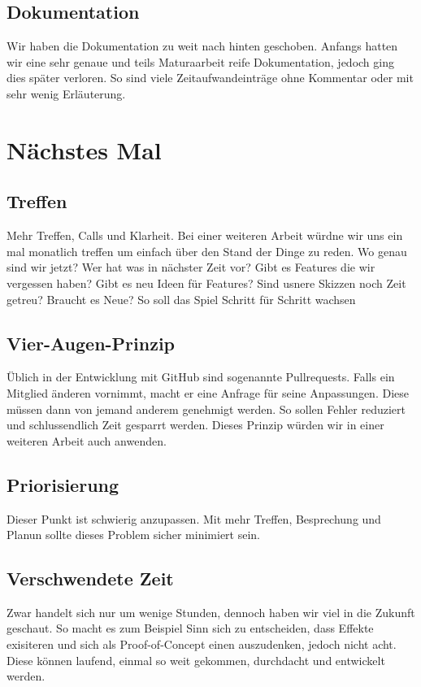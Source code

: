 \subsection*{Dokumentation}
Wir haben die Dokumentation zu weit nach hinten geschoben.
Anfangs hatten wir eine sehr genaue und teils Maturaarbeit reife Dokumentation, jedoch ging dies später verloren.
So sind viele Zeitaufwandeinträge ohne Kommentar oder mit sehr wenig Erläuterung.

\section{Nächstes Mal}

\subsection*{Treffen}
Mehr Treffen, Calls und Klarheit.
Bei einer weiteren Arbeit würdne wir uns ein mal monatlich treffen um einfach über den Stand der Dinge zu reden.
Wo genau sind wir jetzt?
Wer hat was in nächster Zeit vor?
Gibt es Features die wir vergessen haben?
Gibt es neu Ideen für Features?
Sind usnere Skizzen noch Zeit getreu?
Braucht es Neue?
So soll das Spiel Schritt für Schritt wachsen

\subsection*{Vier-Augen-Prinzip}
Üblich in der Entwicklung mit GitHub sind sogenannte Pullrequests.
Falls ein Mitglied änderen vornimmt, macht er eine Anfrage für seine Anpassungen.
Diese müssen dann von jemand anderem genehmigt werden.
So sollen Fehler reduziert und schlussendlich Zeit gesparrt werden.
Dieses Prinzip würden wir in einer weiteren Arbeit auch anwenden.

\subsection*{Priorisierung}
Dieser Punkt ist schwierig anzupassen.
Mit mehr Treffen, Besprechung und Planun sollte dieses Problem sicher minimiert sein.

\subsection*{Verschwendete Zeit}
Zwar handelt sich nur um wenige Stunden, dennoch haben wir viel in die Zukunft geschaut.
So macht es zum Beispiel Sinn sich zu entscheiden, dass Effekte exisiteren und sich als Proof-of-Concept einen auszudenken, jedoch nicht acht.
Diese können laufend, einmal so weit gekommen, durchdacht und entwickelt werden.